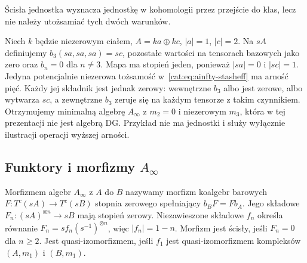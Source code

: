 Ścisła jednostka wyznacza jednostkę w kohomologii przez przejście do klas, lecz nie należy utożsamiać tych dwóch warunków.

\begin{przyklad}\label{cat:ex:ainfty-higher-operation}
Niech $k$ będzie niezerowym ciałem, $A=ka\oplus kc$, $|a|=1$, $|c|=2$. Na $sA$ definiujemy $b_3(sa,sa,sa)=sc$, pozostałe wartości na tensorach bazowych jako zero oraz $b_n=0$ dla $n\neq3$. Mapa ma stopień jeden, ponieważ $|sa|=0$ i $|sc|=1$. Jedyna potencjalnie niezerowa tożsamość w~\eqref{cat:eq:ainfty-stasheff} ma arność pięć. Każdy jej składnik jest jednak zerowy: wewnętrzne $b_3$ albo jest zerowe, albo wytwarza $sc$, a zewnętrzne $b_3$ zeruje się na każdym tensorze z takim czynnikiem. Otrzymujemy minimalną algebrę $A_\infty$ z $m_2=0$ i niezerowym $m_3$, która w tej prezentacji nie jest algebrą DG. Przykład nie ma jednostki i służy wyłącznie ilustracji operacji wyższej arności.
\end{przyklad}

\subsection{\texorpdfstring{Funktory i morfizmy $A_\infty$}{Funktory i morfizmy A-infty}}

\begin{definicja}\label{cat:def:ainfty-morphism}
Morfizmem algebr $A_\infty$ z $A$ do $B$ nazywamy morfizm koalgebr barowych $F:T^c(sA)\to T^c(sB)$ stopnia zerowego spełniający $b_B F=F b_A$. Jego składowe $F_n:(sA)^{\otimes n}\to sB$ mają stopień zerowy. Niezawieszone składowe $f_n$ określa równanie $F_n=s f_n(s^{-1})^{\otimes n}$, więc $|f_n|=1-n$. Morfizm jest ścisły, jeśli $F_n=0$ dla $n\geq2$. Jest quasi-izomorfizmem, jeśli $f_1$ jest quasi-izomorfizmem kompleksów $(A,m_1)$ i $(B,m_1)$.
\end{definicja}

